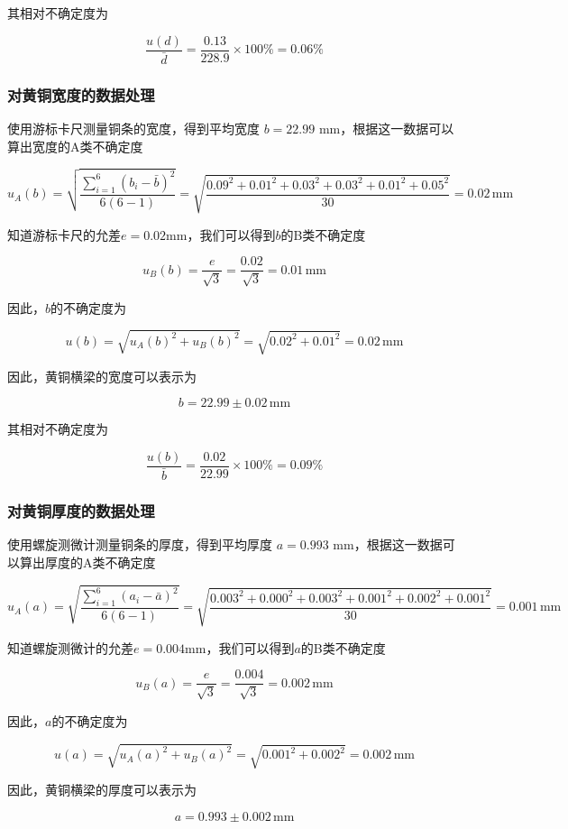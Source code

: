 \documentclass[zihao=5, UTF8]{article}
\theoremstyle{MyLineTheoremStyle} %
\theoremstyle{MyBlockTheoremStyle} %
\theoremstyle{MySubsubsectionStyle} %
\begin{document}
其相对不确定度为

\[ \frac{u(d)}{\bar{d}} = \frac{0.13}{228.9} \times 100 \% = 0.06 \% \]

\subsubsection{对黄铜宽度的数据处理}

使用游标卡尺测量铜条的宽度，得到平均宽度 $b = 22.99$ mm，根据这一数据可以算出宽度的A类不确定度

\[ u_A(b) = \sqrt{\frac{\sum_{i=1}^{6} (b_i - \bar{b})^2}{6(6-1)}} = \sqrt{\frac{0.09^2 + 0.01^2 + 0.03^2 + 0.03^2 + 0.01^2 + 0.05^2}{30}} = 0.02 \, \text{mm} \]

知道游标卡尺的允差$e = 0.02$mm，我们可以得到$b$的B类不确定度

\[ u_B(b) = \frac{e}{\sqrt{3}} = \frac{0.02}{\sqrt{3}} = 0.01 \, \text{mm} \]

因此，$b$的不确定度为

\[ u(b) = \sqrt{u_A(b)^2 + u_B(b)^2} = \sqrt{0.02^2 + 0.01^2} = 0.02 \, \text{mm} \]

因此，黄铜横梁的宽度可以表示为

\[ b = 22.99 \pm 0.02 \, \text{mm} \]

其相对不确定度为

\[ \frac{u(b)}{\bar{b}} = \frac{0.02}{22.99} \times 100 \% = 0.09 \% \]

\subsubsection{对黄铜厚度的数据处理}

使用螺旋测微计测量铜条的厚度，得到平均厚度 $a = 0.993$ mm，根据这一数据可以算出厚度的A类不确定度

\[ u_A(a) = \sqrt{\frac{\sum_{i=1}^{6} (a_i - \bar{a})^2}{6(6-1)}} = \sqrt{\frac{0.003^2 + 0.000^2 + 0.003^2 + 0.001^2 + 0.002^2 + 0.001^2}{30}} = 0.001 \, \text{mm} \]

知道螺旋测微计的允差$e = 0.004$mm，我们可以得到$a$的B类不确定度

\[ u_B(a) = \frac{e}{\sqrt{3}} = \frac{0.004}{\sqrt{3}} = 0.002 \, \text{mm} \]

因此，$a$的不确定度为

\[ u(a) = \sqrt{u_A(a)^2 + u_B(a)^2} = \sqrt{0.001^2 + 0.002^2} = 0.002 \, \text{mm} \]

因此，黄铜横梁的厚度可以表示为

\[ a = 0.993 \pm 0.002 \, \text{mm} \]
\end{document}
